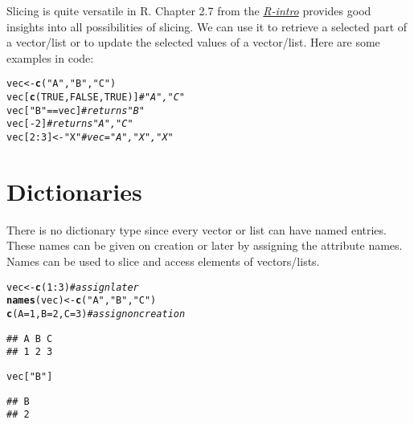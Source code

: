 \documentclass[twoside,twocolumn]{article}\usepackage[]{graphicx}\usepackage[dvipsnames]{xcolor}
\makeatletter
\newcommand{\hlnum}[1]{\textcolor[rgb]{0.686,0.059,0.569}{#1}}%
\newcommand{\hlstr}[1]{\textcolor[rgb]{0.192,0.494,0.8}{#1}}%
\newcommand{\hlcom}[1]{\textcolor[rgb]{0.678,0.584,0.686}{\textit{#1}}}%
\newcommand{\hlopt}[1]{\textcolor[rgb]{0,0,0}{#1}}%
\newcommand{\hlstd}[1]{\textcolor[rgb]{0.345,0.345,0.345}{#1}}%
\newcommand{\hlkwb}[1]{\textcolor[rgb]{0.69,0.353,0.396}{#1}}%
\newcommand{\hlkwc}[1]{\textcolor[rgb]{0.333,0.667,0.333}{#1}}%
\newcommand{\hlkwd}[1]{\textcolor[rgb]{0.737,0.353,0.396}{\textbf{#1}}}%
\newenvironment{kframe}{%
 \def\at@end@of@kframe{}%
 \ifinner\ifhmode%
  \def\at@end@of@kframe{\end{minipage}}%
  \begin{minipage}{\columnwidth}%
 \fi\fi%
 \def\FrameCommand##1{\hskip\@totalleftmargin \hskip-\fboxsep
 \colorbox{shadecolor}{##1}\hskip-\fboxsep
     \hskip-\linewidth \hskip-\@totalleftmargin \hskip\columnwidth}%
 \MakeFramed {\advance\hsize-\width
   \@totalleftmargin\z@ \linewidth\hsize
   \@setminipage}}%
 {\par\unskip\endMakeFramed%
 \at@end@of@kframe}
\newenvironment{knitrout}{}{} %
\makeatother
\begin{document}
Slicing is quite versatile in R. Chapter 2.7 from the \href{https://rstudio.github.io/r-manuals/r-intro/Simple-manipulations-numbers-and-vectors.html#index-vectors-selecting-and-modifying-subsets-of-a-data-set}{\textit{R-intro}} provides good insights into all possibilities of slicing. We can use it to retrieve a selected part of a vector/list or to update the selected values of a vector/list. Here are some examples in code:
\begin{knitrout}
\color{fgcolor}\begin{kframe}
\begin{alltt}
\hlstd{vec} \hlkwb{<-} \hlkwd{c}\hlstd{(}\hlstr{"A"}\hlstd{,}\hlstr{"B"}\hlstd{,}\hlstr{"C"}\hlstd{)}
\hlstd{vec[}\hlkwd{c}\hlstd{(}\hlnum{TRUE}\hlstd{,} \hlnum{FALSE}\hlstd{,} \hlnum{TRUE}\hlstd{)]} \hlcom{# "A", "C"}
\hlstd{vec[}\hlstr{"B"} \hlopt{==} \hlstd{vec]} \hlcom{# returns "B"}
\hlstd{vec[}\hlopt{-}\hlnum{2}\hlstd{]} \hlcom{# returns "A", "C"}
\hlstd{vec[}\hlnum{2}\hlopt{:}\hlnum{3}\hlstd{]} \hlkwb{<-} \hlstr{"X"} \hlcom{# vec = "A", "X", "X"}
\end{alltt}
\end{kframe}
\end{knitrout}

\section*{Dictionaries}
There is no dictionary type since every vector or list can have named entries. These names can be given on creation or later by assigning the attribute names. Names can be used to slice and access elements of vectors/lists.
\begin{knitrout}
\color{fgcolor}\begin{kframe}
\begin{alltt}
\hlstd{vec} \hlkwb{<-} \hlkwd{c}\hlstd{(}\hlnum{1}\hlopt{:}\hlnum{3}\hlstd{)} \hlcom{# assign later}
\hlkwd{names}\hlstd{(vec)} \hlkwb{<-} \hlkwd{c}\hlstd{(}\hlstr{"A"}\hlstd{,}\hlstr{"B"}\hlstd{,}\hlstr{"C"}\hlstd{)}
\hlkwd{c}\hlstd{(}\hlkwc{A}\hlstd{=}\hlnum{1}\hlstd{,}\hlkwc{B}\hlstd{=}\hlnum{2}\hlstd{,}\hlkwc{C}\hlstd{=}\hlnum{3}\hlstd{)} \hlcom{# assign on creation}
\end{alltt}
\begin{verbatim}
## A B C 
## 1 2 3
\end{verbatim}
\begin{alltt}
\hlstd{vec[}\hlstr{"B"}\hlstd{]}
\end{alltt}
\begin{verbatim}
## B 
## 2
\end{verbatim}
\end{kframe}
\end{knitrout}
\end{document}
